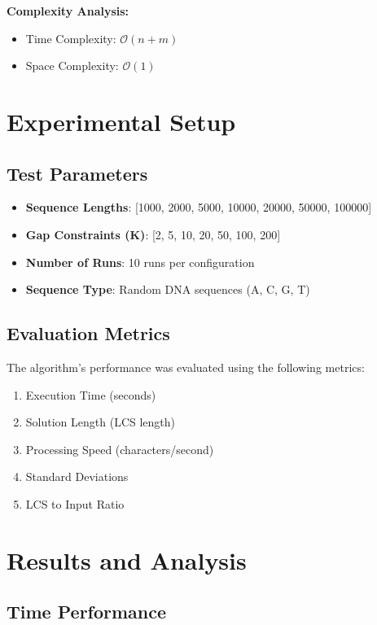 \documentclass[11pt,a4paper]{article}
\begin{document}
\textbf{Complexity Analysis:}
\begin{itemize}
    \item Time Complexity: $\mathcal{O}(n + m)$
    \item Space Complexity: $\mathcal{O}(1)$
\end{itemize}

\section{Experimental Setup}

\subsection{Test Parameters}

\begin{itemize}
    \item \textbf{Sequence Lengths}: [1000, 2000, 5000, 10000, 20000, 50000, 100000]
    \item \textbf{Gap Constraints (K)}: [2, 5, 10, 20, 50, 100, 200]
    \item \textbf{Number of Runs}: 10 runs per configuration
    \item \textbf{Sequence Type}: Random DNA sequences (A, C, G, T)
\end{itemize}

\subsection{Evaluation Metrics}

The algorithm's performance was evaluated using the following metrics:
\begin{enumerate}
    \item Execution Time (seconds)
    \item Solution Length (LCS length)
    \item Processing Speed (characters/second)
    \item Standard Deviations
    \item LCS to Input Ratio
\end{enumerate}

\section{Results and Analysis}

\subsection{Time Performance}
\end{document}
